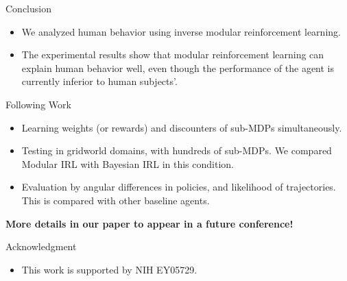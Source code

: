 \documentclass[final]{beamer}
\begin{document}
\begin{frame}{}
\begin{textblock}{39}
\begin{block}{Conclusion}
\begin{itemize}
\item
We analyzed human behavior using inverse modular reinforcement learning.
\item
The experimental results show that modular reinforcement learning can explain
human behavior well, even though the performance of the agent is currently
inferior to human subjects'.
\end{itemize}
\end{block}

\begin{block}{Following Work}
\begin{itemize}
\item
Learning weights (or rewards) and discounters of sub-MDPs simultaneously.
\item
Testing in gridworld domains, with hundreds of sub-MDPs. We compared Modular IRL
with Bayesian IRL in this condition.
\item
Evaluation by angular differences in policies, and likelihood of trajectories.
This is compared with other baseline agents.
\end{itemize}

{\bf More details in our paper to appear in a future conference!}
\end{block}

\begin{block}{Acknowledgment}
\begin{itemize}
\item This work is supported by NIH EY05729.
\end{itemize}
\end{block}

\end{textblock}

\end{frame}
\end{document}
